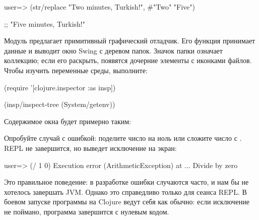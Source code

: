 \begin{english}
  \begin{clojure}
user=> (str/replace
          "Two minutes, Turkish!",
           #"Two" "Five")

;; "Five minutes, Turkish!"
  \end{clojure}
\end{english}


Модуль  предлагает примитивный графический отладчик. Его функция  принимает данные и выводит окно Swing с деревом папок. Значок папки означает коллекцию; если его раскрыть, появятся дочерние элементы с иконками файлов. Чтобы изучить переменные среды, выполните:

\begin{english}
  \begin{clojure}
(require '[clojure.inspector :as insp])

(insp/inspect-tree (System/getenv))
  \end{clojure}
\end{english}


Содержимое окна будет примерно таким:

\vspace{3mm}


\vspace{3mm}

Опробуйте случай с ошибкой: поделите число на ноль или сложите число с . REPL не завершится, но выведет исключение на экран:

\begin{english}
  \begin{clojure}
user=> (/ 1 0)
Execution error (ArithmeticException) at ...
Divide by zero
  \end{clojure}
\end{english}

Это правильное поведение: в разработке ошибки случаются часто, и нам бы не хотелось завершать JVM. Однако это справедливо только для сеанса REPL. В боевом запуске программы на Clojure ведут себя как обычно: если исключение не поймано, программа завершится с нулевым кодом.


